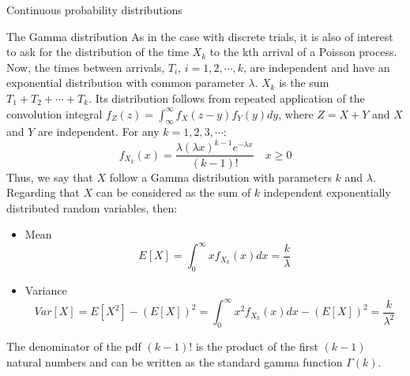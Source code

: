 \documentclass[8pt]{beamer}
\renewcommand{\emph}[1]{\textcolor{myorange}{#1}}
\begin{document}
\begin{frame}{Continuous probability distributions} 
    \begin{block}{The \alert{Gamma} distribution}
        As in the case with discrete trials, it is also of interest to ask for the distribution of the time $X_k$ to the kth arrival of a \alert{Poisson process}. Now, the times between arrivals, $T_i$, $i= 1,2, \cdots, k$, are independent and have an exponential distribution with common parameter $\lambda$. $X_k$ is the sum  $T_1 + T_2 + \cdots + T_k$. Its distribution follows from repeated application of the convolution integral $f_Z (z) = \int_\infty^\infty f_X (z - y) f_Y (y) dy$, where $Z = X + Y$ and $X$ and $Y$ are independent. For any $k = 1, 2, 3, \cdots$:
        \[
            f_{X_k} (x) = \frac{\lambda (\lambda x)^{k-1} e^{-\lambda x}}{(k-1)!} \quad x \geq 0
        \]
        Thus, we say that $X$ follow a \emph{Gamma distribution} with parameters $k$ and $\lambda$. Regarding that $X$ can be considered as the sum of $k$ independent exponentially distributed random variables, then:
        \begin{itemize}
            \item \emph{Mean}
                \[
                    E[X] = \int_0^\infty x f_{X_k} (x) dx = \frac{k}{\lambda}
                \]
            \item \emph{Variance}
                \[
                    Var[X] = E[X^2] - \left( E[X] \right)^2 = \int_0^\infty x^2 f_{X_k} (x) dx - \left( E[X] \right)^2 = \frac{k}{\lambda^2}
                \]
        \end{itemize}
        The denominator of the \emph{pdf} $(k-1)!$ is the product of the first $(k-1)$ natural numbers and can be written as the \alert{standard gamma function} $\Gamma (k)$. 
     \end{block}

\end{frame}
\end{document}
